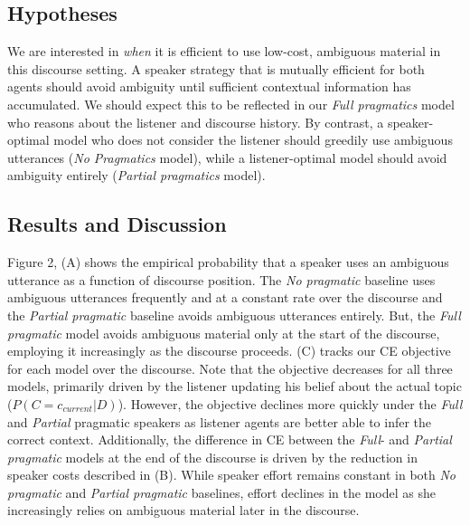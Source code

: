\documentclass[10pt, letterpaper]{article}
\begin{document}
\subsection{Hypotheses}\label{hypotheses}

We are interested in \textit{when} it is efficient to use low-cost,
ambiguous material in this discourse setting. A speaker strategy that is
mutually efficient for both agents should avoid ambiguity until
sufficient contextual information has accumulated. We should expect this
to be reflected in our \textit{Full pragmatics} model who reasons about
the listener and discourse history. By contrast, a speaker-optimal model
who does not consider the listener should greedily use ambiguous
utterances (\textit{No Pragmatics} model), while a listener-optimal
model should avoid ambiguity entirely (\textit{Partial pragmatics}
model).\par

\subsection{Results and Discussion}\label{results-and-discussion-1}

Figure 2, (A) shows the empirical probability that a speaker uses an
ambiguous utterance as a function of discourse position. The
\textit{No pragmatic} baseline uses ambiguous utterances frequently and
at a constant rate over the discourse and the \textit{Partial pragmatic}
baseline avoids ambiguous utterances entirely. But, the
\textit{Full pragmatic} model avoids ambiguous material only at the
start of the discourse, employing it increasingly as the discourse
proceeds. (C) tracks our CE objective for each model over the discourse.
Note that the objective decreases for all three models, primarily driven
by the listener updating his belief about the actual topic
(\(P(C=c_{current}|D)\)). However, the objective declines more quickly
under the \textit{Full} and \textit{Partial} pragmatic speakers as
listener agents are better able to infer the correct context.
Additionally, the difference in CE between the \textit{Full}- and
\textit{Partial pragmatic} models at the end of the discourse is driven
by the reduction in speaker costs described in (B). While speaker effort
remains constant in both \textit{No pragmatic} and
\textit{Partial pragmatic} baselines, effort declines in the
 model as she increasingly relies on ambiguous
material later in the discourse.\par
\end{document}
